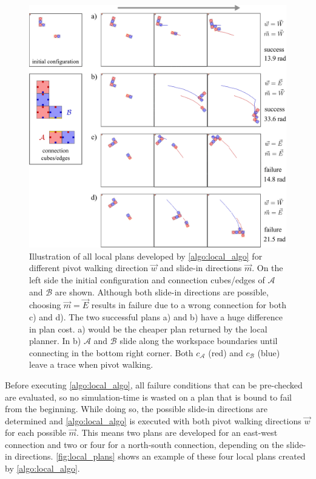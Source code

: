 \begin{figure}
	\centering
	\includegraphics[width=1\textwidth]{figures/local_plans.pdf}
	\caption[Local plans for all pivot walking and slide-in directions]{Illustration of all local plans developed by \autoref{algo:local_algo} for different pivot walking direction $\vec{w}$ and slide-in directions $\vec{m}$. On the left side the initial configuration and connection cubes/edges of $\mathcal{A}$ and $\mathcal{B}$ are shown. Although both slide-in directions are possible, choosing $\vec{m}=\vec{E}$ results in failure due to a wrong connection for both c) and d). The two successful plans a) and b) have a huge difference in plan cost. a) would be the cheaper plan returned by the local planner. In b) $\mathcal{A}$ and $\mathcal{B}$ slide along the workspace boundaries until connecting in the bottom right corner. Both $c_\mathcal{A}$ (red) and $c_\mathcal{B}$ (blue) leave a trace when pivot walking.}
	\label{fig:local_plans}
\end{figure}

Before executing \autoref{algo:local_algo}, all failure conditions that can be pre-checked are evaluated, so no simulation-time is wasted on a plan that is bound to fail from the beginning.
While doing so, the possible slide-in directions are determined and \autoref{algo:local_algo} is executed with both pivot walking directions $\vec{w}$ for each possible $\vec{m}$.
This means two plans are developed for an east-west connection and two or four for a north-south connection, depending on the slide-in directions.
\autoref{fig:local_plans} shows an example of these four local plans created by \autoref{algo:local_algo}.

